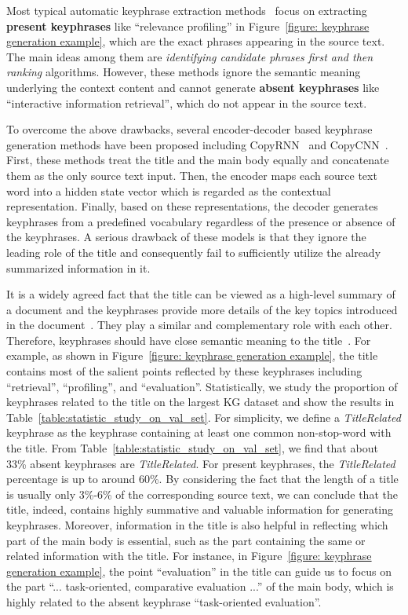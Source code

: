 \documentclass[letterpaper]{article} %
\begin{document}
Most typical automatic keyphrase extraction methods~\cite{witten1999kea,medelyan2009human,mihalcea2004textrank} focus on extracting \textbf{present keyphrases} like ``relevance profiling'' in Figure~\ref{figure: keyphrase generation example}, which are the exact phrases appearing in the source text. The main ideas among them are \textit{identifying candidate phrases first and then ranking} algorithms. However, these methods ignore the semantic meaning underlying the context content and cannot generate \textbf{absent keyphrases} like ``interactive information retrieval'', which do not appear in the source text. 


To overcome the above drawbacks, several encoder-decoder based keyphrase generation methods have been proposed including CopyRNN~\cite{meng2017dkg} and CopyCNN~\cite{zhang2017dkg_conv}. First, these methods treat the title and the main body equally and concatenate them as the only source text input. Then, the encoder maps each source text word into a hidden state vector which is regarded as the contextual representation. Finally, based on these representations, the decoder generates keyphrases from a predefined vocabulary regardless of the presence or absence of the keyphrases. 
A serious drawback of these models is that they ignore the leading role of the title and consequently fail to sufficiently utilize the already summarized information in it.


It is a widely agreed fact that the title can be viewed as a high-level summary of a document and the keyphrases provide more details of the key topics introduced in the document~\cite{li2010semi_title}. They play a similar and complementary role with each other. Therefore, keyphrases should have close semantic meaning to the title~\cite{li2010semi_title}. For example, as shown in Figure~\ref{figure: keyphrase generation example}, the title contains most of the salient points reflected by these keyphrases including ``retrieval'', ``profiling'', and ``evaluation''. Statistically, we study the proportion of keyphrases related to the title on the largest KG dataset and show the results in Table~\ref{table:statistic_study_on_val_set}. For simplicity, we define a \textit{TitleRelated} keyphrase as the keyphrase containing at least one common non-stop-word with the title. From Table~\ref{table:statistic_study_on_val_set}, we find that about 33\% absent keyphrases are \textit{TitleRelated}. For present keyphrases, the \textit{TitleRelated} percentage is up to around 60\%. By considering the fact that the length of a title is usually only 3\%-6\% of the corresponding source text, we can conclude that the title, indeed, contains highly summative and valuable information for generating keyphrases. 
Moreover, information in the title is also helpful in reflecting which part of the main body is essential, such as the part containing the same or related information with the title. For instance, in Figure~\ref{figure: keyphrase generation example}, the point ``evaluation'' in the title can guide us to focus on the part ``... task-oriented, comparative evaluation ...'' of the main body, which is highly related to the absent keyphrase ``task-oriented evaluation''.
\end{document}
